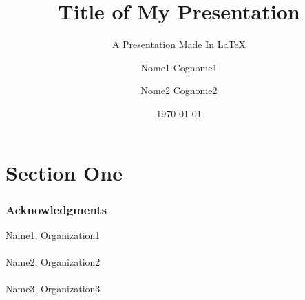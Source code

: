 \documentclass[xcolor={usenames,dvipsnames},hyperref={hyperindex,bookmarks}]{beamer}
\begin{document}

{

	\title[Cover Title]
	{Title of My Presentation}
	\subtitle{A Presentation Made In \LaTeX}
	\author{Nome1 Cognome1 \and Nome2 Cognome2}
	\date{\today}	%
	\subject{Subject Title}
	\frame{\titlepage}
}

\section{Section One}


\begin{frame}
	\frametitle{Acknowledgments}
	Name1, Organization1 \\
	\ \\
	Name2, Organization2 \\
	\ \\
	Name3, Organization3
\end{frame}
\end{document}
